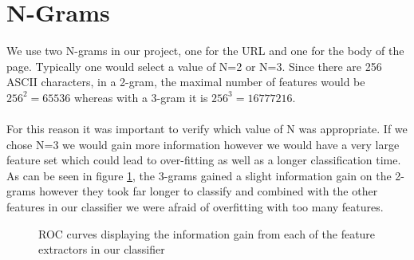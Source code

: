 \documentclass[12pt,twoside]{report}
\begin{document}
\section{N-Grams}
We use two N-grams in our project, one for the URL and one for the body of the page. Typically one would select a value of N=2 or N=3. Since there are 256 ASCII characters, in a 2-gram, the maximal number of features would be $256^2 = 65536$ whereas with a 3-gram it is $256^3 = 16777216$.
\\\\
For this reason it was important to verify which value of N was appropriate. If we chose N=3 we would gain more information however we would have a very large feature set which could lead to over-fitting as well as a longer classification time. As can be seen in figure \ref{fig:roc_approaches}, the 3-grams gained a slight information gain on the 2-grams however they took far longer to classify and combined with the other features in our classifier we were afraid of overfitting with too many features.
\begin{figure}
    \endminipage
    \endminipage
    \caption{ROC curves displaying the information gain from each of the feature extractors in our classifier}
    \label{fig:roc_approaches}
\end{figure}
\\
\end{document}
